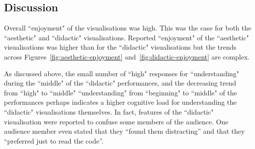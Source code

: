 \documentclass{sig-alternate}
\begin{document}
\subsection{Discussion}


Overall ``enjoyment" of the visualisations was high. This was the case for both the ``aesthetic" and ``didactic" visualisations.
Reported ``enjoyment" of the ``aesthetic" visualisations was higher than for the ``didactic" visualisations but the trends across Figures~\ref{fig:aesthetic-enjoyment} and~\ref{fig:didactic-enjoyment} are complex. 




 As discussed above, the small number of ``high" responses for ``understanding" during the ``middle" of the ``didactic" performances, and the decreasing trend from ``high" to ``middle" ``understanding" from ``beginning" to ``middle" of the performances perhaps indicates a higher cognitive load for understanding the ``didactic" visualisations themselves. In fact, features of the ``didactic" visualisation were reported to confuse some members of the audience. One audience member even stated that they ``found them distracting'' and that they ``preferred just to read the code''.

\end{document}
